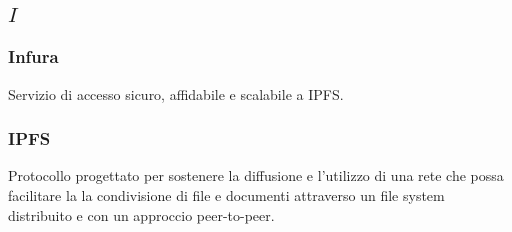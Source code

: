 \subsection*{\quad$I\quad$}
\subsubsection*{Infura}
Servizio di accesso sicuro, affidabile e scalabile a IPFS\glo.

\subsubsection*{IPFS}
Protocollo progettato per sostenere la diffusione e l'utilizzo di una rete che possa facilitare la la condivisione di file e documenti attraverso un file system distribuito e con un approccio peer-to-peer\glo.

